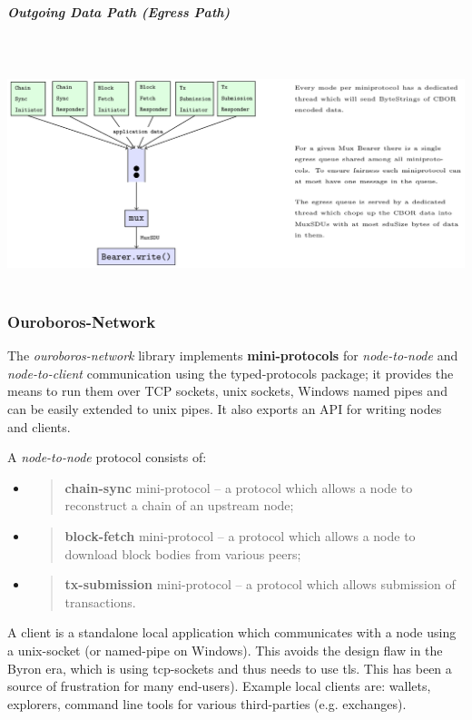 \documentclass[11pt,a4paper]{article}
\begin{document}
\subparagraph{Outgoing Data Path (Egress Path)}

~\includegraphics[width=6.27083in,height=2.59722in]{./media/image6.png}

\subsubsection{Ouroboros-Network}
\label{ouroboros-network}

The \emph{ouroboros-network} library implements \textbf{mini-protocols}
for \emph{node-to-node} and \emph{node-to-client} communication using
the typed-protocols package; it provides the means to run them over TCP
sockets, unix sockets, Windows named pipes and can be easily extended to
unix pipes. It also exports an API for writing nodes and clients.

A \emph{node-to-node} protocol consists of:

\begin{itemize}
\item
  \begin{quote}
  \textbf{chain-sync} mini-protocol -- a protocol which allows a node to
  reconstruct a chain of an upstream node;
  \end{quote}
\item
  \begin{quote}
  \textbf{block-fetch} mini-protocol -- a protocol which allows a node
  to download block bodies from various peers;
  \end{quote}
\item
  \begin{quote}
  \textbf{tx-submission} mini-protocol -- a protocol which allows
  submission of transactions.
  \end{quote}
\end{itemize}

A client is a standalone local application which communicates with a
node using a unix-socket (or named-pipe on Windows). This avoids the
design flaw in the Byron era, which is using tcp-sockets and thus needs
to use tls. This has been a source of frustration for many end-users).
Example local clients are: wallets, explorers, command line tools for
various third-parties (e.g. exchanges).
\end{document}

